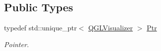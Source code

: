 \subsection*{Public Types}
\begin{DoxyCompactItemize}
\item 
typedef std\+::unique\+\_\+ptr$<$ \hyperlink{classQGLVisualizer}{Q\+G\+L\+Visualizer} $>$ \hyperlink{classQGLVisualizer_acc1cc199f42495cfda1df074ac06a57a}{Ptr}\hypertarget{classQGLVisualizer_acc1cc199f42495cfda1df074ac06a57a}{}\label{classQGLVisualizer_acc1cc199f42495cfda1df074ac06a57a}

\begin{DoxyCompactList}\small\item\em Pointer. \end{DoxyCompactList}\end{DoxyCompactItemize}

